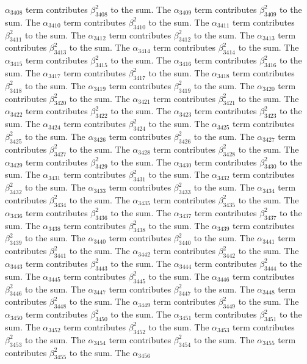 \begin{lemma}
$\alpha_{3408}$ term contributes $\beta_{3408}^{2}$ to the sum. The $\alpha_{3409}$ term contributes $\beta_{3409}^{2}$ to the sum. The $\alpha_{3410}$ term contributes $\beta_{3410}^{2}$ to the sum. The $\alpha_{3411}$ term contributes $\beta_{3411}^{2}$ to the sum. The $\alpha_{3412}$ term contributes $\beta_{3412}^{2}$ to the sum. The $\alpha_{3413}$ term contributes $\beta_{3413}^{2}$ to the sum. The $\alpha_{3414}$ term contributes $\beta_{3414}^{2}$ to the sum. The $\alpha_{3415}$ term contributes $\beta_{3415}^{2}$ to the sum. The $\alpha_{3416}$ term contributes $\beta_{3416}^{2}$ to the sum. The $\alpha_{3417}$ term contributes $\beta_{3417}^{2}$ to the sum. The $\alpha_{3418}$ term contributes $\beta_{3418}^{2}$ to the sum. The $\alpha_{3419}$ term contributes $\beta_{3419}^{2}$ to the sum. The $\alpha_{3420}$ term contributes $\beta_{3420}^{2}$ to the sum. The $\alpha_{3421}$ term contributes $\beta_{3421}^{2}$ to the sum. The $\alpha_{3422}$ term contributes $\beta_{3422}^{2}$ to the sum. The $\alpha_{3423}$ term contributes $\beta_{3423}^{2}$ to the sum. The $\alpha_{3424}$ term contributes $\beta_{3424}^{2}$ to the sum. The $\alpha_{3425}$ term contributes $\beta_{3425}^{2}$ to the sum. The $\alpha_{3426}$ term contributes $\beta_{3426}^{2}$ to the sum. The $\alpha_{3427}$ term contributes $\beta_{3427}^{2}$ to the sum. The $\alpha_{3428}$ term contributes $\beta_{3428}^{2}$ to the sum. The $\alpha_{3429}$ term contributes $\beta_{3429}^{2}$ to the sum. The $\alpha_{3430}$ term contributes $\beta_{3430}^{2}$ to the sum. The $\alpha_{3431}$ term contributes $\beta_{3431}^{2}$ to the sum. The $\alpha_{3432}$ term contributes $\beta_{3432}^{2}$ to the sum. The $\alpha_{3433}$ term contributes $\beta_{3433}^{2}$ to the sum. The $\alpha_{3434}$ term contributes $\beta_{3434}^{2}$ to the sum. The $\alpha_{3435}$ term contributes $\beta_{3435}^{2}$ to the sum. The $\alpha_{3436}$ term contributes $\beta_{3436}^{2}$ to the sum. The $\alpha_{3437}$ term contributes $\beta_{3437}^{2}$ to the sum. The $\alpha_{3438}$ term contributes $\beta_{3438}^{2}$ to the sum. The $\alpha_{3439}$ term contributes $\beta_{3439}^{2}$ to the sum. The $\alpha_{3440}$ term contributes $\beta_{3440}^{2}$ to the sum. The $\alpha_{3441}$ term contributes $\beta_{3441}^{2}$ to the sum. The $\alpha_{3442}$ term contributes $\beta_{3442}^{2}$ to the sum. The $\alpha_{3443}$ term contributes $\beta_{3443}^{2}$ to the sum. The $\alpha_{3444}$ term contributes $\beta_{3444}^{2}$ to the sum. The $\alpha_{3445}$ term contributes $\beta_{3445}^{2}$ to the sum. The $\alpha_{3446}$ term contributes $\beta_{3446}^{2}$ to the sum. The $\alpha_{3447}$ term contributes $\beta_{3447}^{2}$ to the sum. The $\alpha_{3448}$ term contributes $\beta_{3448}^{2}$ to the sum. The $\alpha_{3449}$ term contributes $\beta_{3449}^{2}$ to the sum. The $\alpha_{3450}$ term contributes $\beta_{3450}^{2}$ to the sum. The $\alpha_{3451}$ term contributes $\beta_{3451}^{2}$ to the sum. The $\alpha_{3452}$ term contributes $\beta_{3452}^{2}$ to the sum. The $\alpha_{3453}$ term contributes $\beta_{3453}^{2}$ to the sum. The $\alpha_{3454}$ term contributes $\beta_{3454}^{2}$ to the sum. The $\alpha_{3455}$ term contributes $\beta_{3455}^{2}$ to the sum. The $\alpha_{3456}$ 
\end{lemma}
